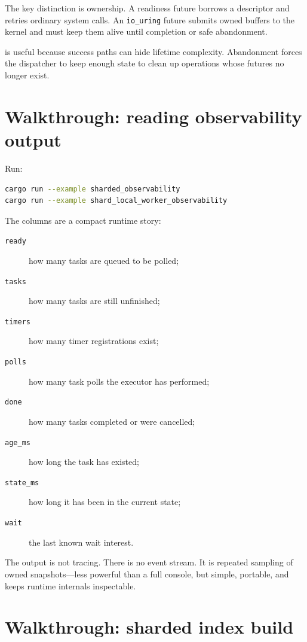 The key distinction is ownership. A readiness future borrows a descriptor and
retries ordinary system calls. An \texttt{io\_uring} future submits owned
buffers to the kernel and must keep them alive until completion or safe
abandonment.

 is useful because success paths can hide
lifetime complexity. Abandonment forces the dispatcher to keep enough state to
clean up operations whose futures no longer exist.

\section{Walkthrough: reading observability output}

Run:

\begin{lstlisting}[language=bash,caption={Observability examples}]
cargo run --example sharded_observability
cargo run --example shard_local_worker_observability
\end{lstlisting}

The columns are a compact runtime story:

\begin{description}
    \item[\texttt{ready}] how many tasks are queued to be polled;
    \item[\texttt{tasks}] how many tasks are still unfinished;
    \item[\texttt{timers}] how many timer registrations exist;
    \item[\texttt{polls}] how many task polls the executor has performed;
    \item[\texttt{done}] how many tasks completed or were cancelled;
    \item[\texttt{age\_ms}] how long the task has existed;
    \item[\texttt{state\_ms}] how long it has been in the current state;
    \item[\texttt{wait}] the last known wait interest.
\end{description}

The output is not tracing. There is no event stream. It is repeated sampling of
owned snapshots---less powerful than a full console, but simple, portable, and
keeps runtime internals inspectable.

\section{Walkthrough: sharded index build}

